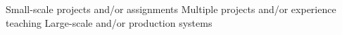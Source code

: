 \documentclass[10pt]{article}
\begin{document}

\begin{footnotesize}
  \oneskill Small-scale projects and/or assignments \hfill
  \twoskill Multiple projects and/or experience teaching \hfill
  \threeskill Large-scale and/or production systems
\end{footnotesize}

\newcommand{\proj}[3]{
  \textsc{#1} & #2\\
   &\href{http://www.#3}{#3}\\
   \multicolumn{2}{c}{} \\ [-1ex]
}

\newcommand{\projl}[3]{
  \textsc{#1} & #2\\
   &\href{http://www.#3}{#3}\\
}

\newcommand{\projlh}[4]{
  \textsc{#1} & #2\\
   &\href{#3}{#4}\\
}
\end{document}
